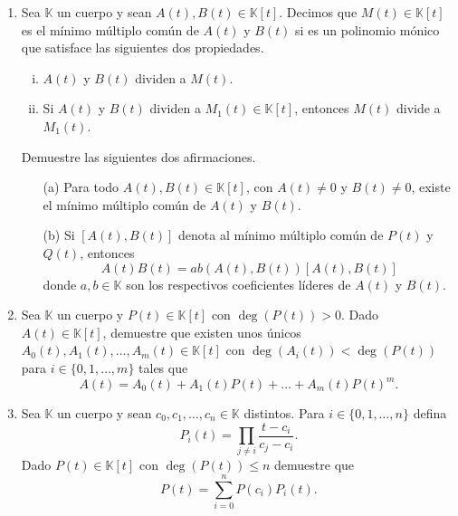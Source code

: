 \begin{enumerate}
\item\label{ejmcm} Sea $\mathbb{K}$ un cuerpo y sean $A(t),B(t)\in \mathbb{K}[t]$. Decimos que $M(t)\in \mathbb{K}[t]$ es el mínimo múltiplo común de $A(t)$ y $B(t)$ si es un polinomio mónico que satisface las siguientes dos propiedades.
\begin{enumerate}[(i)]
\item $A(t)$ y $B(t)$ dividen a $M(t)$.
\item Si $A(t)$ y $B(t)$ dividen a $M_1(t)\in \mathbb{K}[t]$, entonces $M(t)$ divide a $M_1(t)$.
\end{enumerate}
Demuestre las siguientes dos afirmaciones.
\begin{itemize}
\item[(a)] Para todo $A(t),B(t)\in \mathbb{K}[t]$, con $A(t)\ne 0$ y $B(t)\ne 0$, existe el mínimo múltiplo común de $A(t)$ y $B(t)$.
\item[(b)] Si $[A(t),B(t)]$ denota al mínimo múltiplo común de $P(t)$ y $Q(t)$, entonces 
$$A(t)B(t)=ab(A(t),B(t))[A(t),B(t)]$$
donde $a,b\in \mathbb{K}$ son los respectivos coeficientes líderes de $A(t)$ y $B(t)$.
\end{itemize} 

\item Sea $\mathbb{K}$ un cuerpo y $P(t)\in \mathbb{K}[t]$ con $\deg(P(t))>0$. Dado $A(t)\in \mathbb{K}[t]$, demuestre que existen unos únicos $A_0(t),A_1(t),\ldots,A_m(t)\in \mathbb{K}[t]$ con $\deg(A_i(t))<\deg(P(t))$ para $i\in\{0,1,\ldots,m\}$ tales que
$$A(t)=A_0(t)+A_1(t)P(t)+\ldots+A_m(t)P(t)^m.$$

\item Sea $\mathbb{K}$ un cuerpo y sean $c_0,c_1,\ldots,c_n\in \mathbb{K}$ distintos. Para $i\in\{0,1,\ldots,n\}$ defina
$$P_i(t)=\prod_{j\ne i} \dfrac{t-c_i}{c_j-c_i}.$$
Dado $P(t)\in \mathbb{K}[t]$ con $\deg(P(t))\le n$ demuestre que
$$P(t)=\sum_{i=0}^n P(c_i)P_i(t).$$
\end{enumerate}